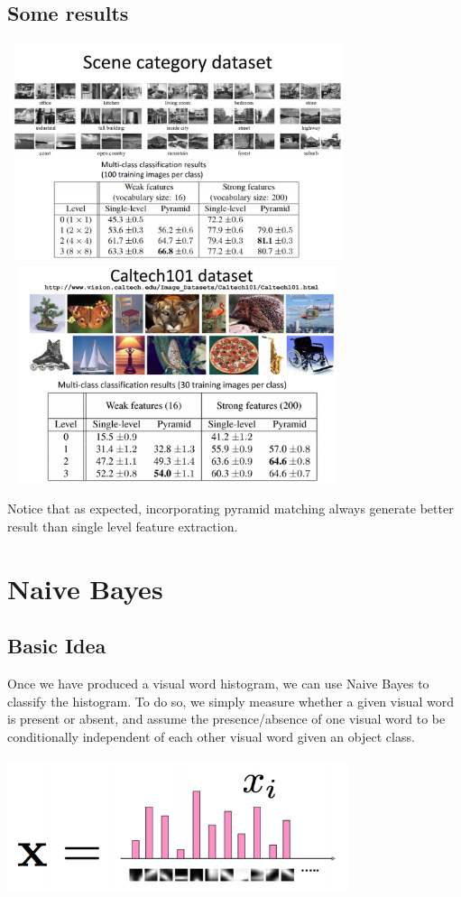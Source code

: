 \documentclass{article}
\begin{document}
\subsection{Some results}
\begin{center}
\includegraphics[width=10cm,height=6.4cm]{pyramid_data1.PNG}
\includegraphics[width=10cm,height=6.4cm]{pyramid_data2.PNG}
\end{center}
Notice that as expected, incorporating pyramid matching always generate better result than single level feature extraction.

\section{Naive Bayes}
\subsection{Basic Idea}
Once we have produced a visual word histogram, we can use Naive Bayes to classify the histogram. To do so, we simply measure whether a given visual word is present or absent, and assume the presence/absence of one visual word to be conditionally independent of each other visual word given an object class. 
\begin{center}
\includegraphics[width=10cm,height=4cm]{Bayes_Histogram}
\end{center}
\end{document}
